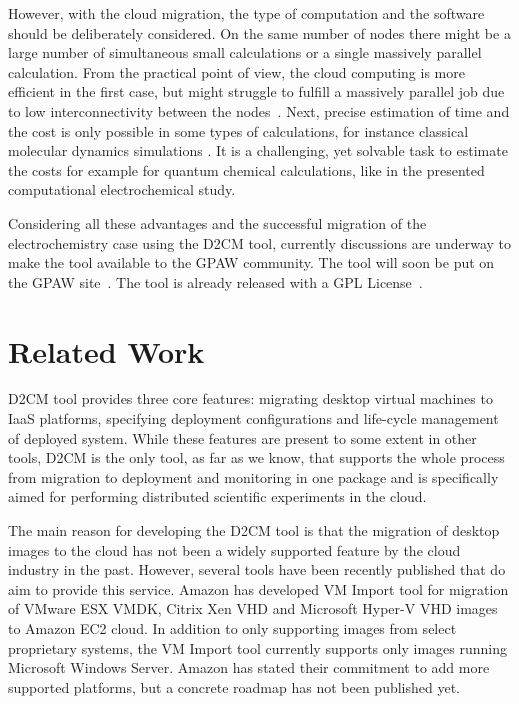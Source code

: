 \documentclass[a4paper,10pt]{article}
\begin{document}
However, with the cloud migration, the type of computation and the software should be deliberately considered. On the same number of nodes there might be a large number of simultaneous small calculations or a single massively parallel calculation. From the practical point of view, the cloud computing is more efficient in the first case, but might struggle to fulfill a massively parallel job due to low interconnectivity between the nodes~\cite{srirama2011scalability}. Next, precise estimation of time and the cost is only possible in some types of calculations, for instance classical molecular dynamics simulations \cite{Ebejer2013}. It is a challenging, yet solvable task to estimate the costs for example for quantum chemical calculations, like in the presented computational electrochemical study. 

Considering all these advantages and the successful migration of the electrochemistry case using the D2CM tool, currently discussions are underway to make the tool available to the GPAW community. The tool will soon be put on the GPAW site~\cite{GPAW}. The tool is already released with a GPL License~\cite{Srirama:MCLab.D2CM}.

















\section{Related Work}

D2CM tool provides three core features: migrating desktop virtual machines to IaaS platforms, specifying deployment configurations and life-cycle management of deployed system. While these features are present to some extent in other tools, D2CM is the only tool, as far as we know, that supports the whole process from migration to deployment and monitoring in one package and is specifically aimed for performing distributed scientific experiments in the cloud.

The main reason for developing the D2CM tool is that the migration of desktop images to the cloud has not been a widely supported feature by the cloud industry in the past. However, several tools have been recently published that do aim to provide this service. Amazon has developed VM Import \cite{vmimport} tool for migration of VMware ESX VMDK, Citrix Xen VHD and Microsoft Hyper-V VHD images to Amazon EC2 cloud. In addition to only supporting images from select proprietary systems, the VM Import tool currently supports only images running Microsoft Windows Server. Amazon has stated their commitment to add more supported platforms, but a concrete roadmap has not been published yet. 
\end{document}

